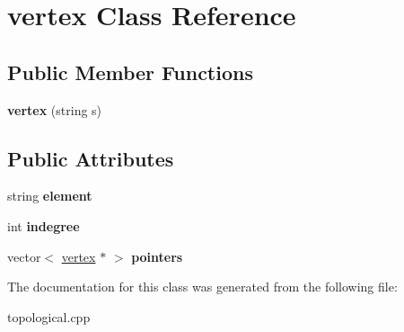 \hypertarget{classvertex}{}\section{vertex Class Reference}
\label{classvertex}
\subsection*{Public Member Functions}
\begin{DoxyCompactItemize}
\item 
\mbox{\label{classvertex_aac822b9ad5842f1e561aaf360935c168}} 
{\bfseries vertex} (string s)
\end{DoxyCompactItemize}
\subsection*{Public Attributes}
\begin{DoxyCompactItemize}
\item 
\mbox{\label{classvertex_a4eb51213ead3d93e18833db4d3c98668}} 
string {\bfseries element}
\item 
\mbox{\label{classvertex_a9c205a497df74d5de40a73e928eaf0df}} 
int {\bfseries indegree}
\item 
\mbox{\label{classvertex_a302d00934a6def62cdefc2b84faae04e}} 
vector$<$ \hyperlink{classvertex}{vertex} $\ast$ $>$ {\bfseries pointers}
\end{DoxyCompactItemize}


The documentation for this class was generated from the following file\+:\begin{DoxyCompactItemize}
\item 
topological.\+cpp\end{DoxyCompactItemize}
